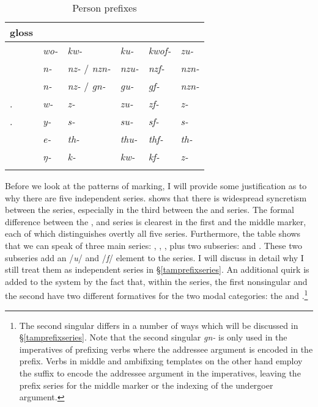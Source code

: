 \begin{table}
\caption{Person prefixes}
\label{perspref}
	\begin{tabularx}{\textwidth}{XXXXXl}
		\lsptoprule
		{gloss} &\Alph &\Bet &\Betaone &\Betatwo &\Gam\\\midrule
		\Fsg &\emph{wo-} &\emph{kw-} &\emph{ku-} &\emph{kwof-} &\emph{zu-}\\
		\Fnsg &\emph{n-} &\emph{nz-} / \emph{nzn-} &\emph{nzu-} &\emph{nzf-} &\emph{nzn-}\\
		\Ssg &\emph{n-}	&\emph{nz-} / \emph{gn-} &\emph{gu-} &\emph{gf-} &\emph{nzn-}\\
		\Tsg.\F &\emph{w-} &\emph{z-} &\emph{zu-} &\emph{zf-} &\emph{z-}\\
		\Tsg.\Masc &\emph{y-} &\emph{s-} &\emph{su-} &\emph{sf-} &\emph{s-}\\
		\Stnsg &\emph{e-} &\emph{th-} &\emph{thu-} &\emph{thf-} &\emph{th-}\\
		\M &\emph{ŋ-} &\emph{k-} &\emph{kw-} &\emph{kf-} &\emph{z-}\\
		\lspbottomrule
	\end{tabularx}
\end{table}%

Before we look at the patterns of  marking, I will provide some justification as to why there are five independent series.  shows that there is widespread syncretism between the series, especially in the third  between the \Bet{} and \Gam{} series. The formal difference between the \Alph, \Bet{} and \Gam{} series is clearest in the first   and the middle marker, each of which distinguishes overtly all five series. Furthermore, the table shows that we can speak of three main series: \Alph, \Bet, \Gam{}, plus two subseries: \Betaone{} and \Betatwo. These two subseries add an /\emph{u}/ and /\emph{f}/ element to the \Bet{} series. I will discuss in detail why I still treat them as independent series in \S{}\ref{tamprefixseries}. An additional quirk is added to the system by the fact that, within the \Bet{} series, the first nonsingular and the second  have two different formatives for the two modal categories: the  and .\footnote{The second singular differs in a number of ways which will be discussed in \S{}\ref{tamprefixseries}. Note that the second singular \emph{gn-} is only used in the imperatives of prefixing verbs where the addressee argument is encoded in the prefix. Verbs in middle and ambifixing templates on the other hand employ the suffix to encode the addressee argument in the imperatives, leaving the prefix \Bet{} series for the middle marker or the indexing of the undergoer argument.}%

